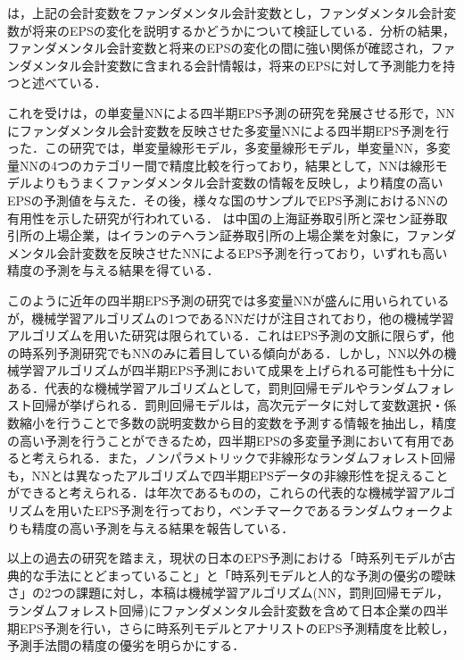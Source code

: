 \documentclass[a4paper，11pt]{jsarticle}
\begin{document}
\noindent
\cite*{abarbanell1997fundamental}は，上記の会計変数をファンダメンタル会計変数とし，ファンダメンタル会計変数が将来のEPSの変化を説明するかどうかについて検証している．分析の結果，ファンダメンタル会計変数と将来のEPSの変化の間に強い関係が確認され，ファンダメンタル会計変数に含まれる会計情報は，将来のEPSに対して予測能力を持つと述べている．

これを受け\cite{zhang2004neural}は，\cite{callen1996neural}の単変量NNによる四半期EPS予測の研究を発展させる形で，NNにファンダメンタル会計変数を反映させた多変量NNによる四半期EPS予測を行った．この研究では，単変量線形モデル，多変量線形モデル，単変量NN，多変量NNの4つのカテゴリー間で精度比較を行っており，結果として，NNは線形モデルよりもうまくファンダメンタル会計変数の情報を反映し，より精度の高いEPSの予測値を与えた．その後，様々な国のサンプルでEPS予測におけるNNの有用性を示した研究が行われている．\cite*{cao2009forecasting} は中国の上海証券取引所と深セン証券取引所の上場企業，\cite{etemadi2015earnings}はイランのテヘラン証券取引所の上場企業を対象に，ファンダメンタル会計変数を反映させたNNによるEPS予測を行っており，いずれも高い精度の予測を与える結果を得ている．

このように近年の四半期EPS予測の研究では多変量NNが盛んに用いられているが，機械学習アルゴリズムの1つであるNNだけが注目されており，他の機械学習アルゴリズムを用いた研究は限られている．これはEPS予測の文脈に限らず，他の時系列予測研究でもNNのみに着目している傾向がある\citep{ahmed2010empirical}．しかし，NN以外の機械学習アルゴリズムが四半期EPS予測において成果を上げられる可能性も十分にある．代表的な機械学習アルゴリズムとして，罰則回帰モデルやランダムフォレスト回帰が挙げられる\citep{hastie2009esl}．罰則回帰モデルは，高次元データに対して変数選択・係数縮小を行うことで多数の説明変数から目的変数を予測する情報を抽出し，精度の高い予測を行うことができるため，四半期EPSの多変量予測において有用であると考えられる．また，ノンパラメトリックで非線形なランダムフォレスト回帰\citep{breiman2001random}も，NNとは異なったアルゴリズムで四半期EPSデータの非線形性を捉えることができると考えられる．\cite*{cao2020fundamental}は年次であるものの，これらの代表的な機械学習アルゴリズムを用いたEPS予測を行っており，ベンチマークであるランダムウォークよりも精度の高い予測を与える結果を報告している．

以上の過去の研究を踏まえ，現状の日本のEPS予測における「時系列モデルが古典的な手法にとどまっていること」と「時系列モデルと人的な予測の優劣の曖昧さ」の2つの課題に対し，本稿は機械学習アルゴリズム(NN，罰則回帰モデル，ランダムフォレスト回帰)にファンダメンタル会計変数を含めて日本企業の四半期EPS予測を行い，さらに時系列モデルとアナリストのEPS予測精度を比較し，予測手法間の精度の優劣を明らかにする．
\end{document}
